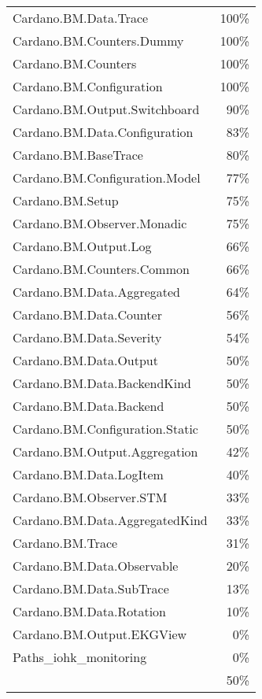 \begin{tabular}{l r}
   Cardano.BM.Data.Trace & 100\% \\
   Cardano.BM.Counters.Dummy & 100\% \\
   Cardano.BM.Counters & 100\% \\
   Cardano.BM.Configuration & 100\% \\
   Cardano.BM.Output.Switchboard & 90\% \\
   Cardano.BM.Data.Configuration & 83\% \\
   Cardano.BM.BaseTrace & 80\% \\
   Cardano.BM.Configuration.Model & 77\% \\
   Cardano.BM.Setup & 75\% \\
   Cardano.BM.Observer.Monadic & 75\% \\
   Cardano.BM.Output.Log & 66\% \\
   Cardano.BM.Counters.Common & 66\% \\
   Cardano.BM.Data.Aggregated & 64\% \\
   Cardano.BM.Data.Counter & 56\% \\
   Cardano.BM.Data.Severity & 54\% \\
   Cardano.BM.Data.Output & 50\% \\
   Cardano.BM.Data.BackendKind & 50\% \\
   Cardano.BM.Data.Backend & 50\% \\
   Cardano.BM.Configuration.Static & 50\% \\
   Cardano.BM.Output.Aggregation & 42\% \\
   Cardano.BM.Data.LogItem & 40\% \\
   Cardano.BM.Observer.STM & 33\% \\
   Cardano.BM.Data.AggregatedKind & 33\% \\
   Cardano.BM.Trace & 31\% \\
   Cardano.BM.Data.Observable & 20\% \\
   Cardano.BM.Data.SubTrace & 13\% \\
   Cardano.BM.Data.Rotation & 10\% \\
   Cardano.BM.Output.EKGView & 0\% \\
   Paths\_iohk\_monitoring & 0\% \\
    & 50\% \\
\end{tabular}
